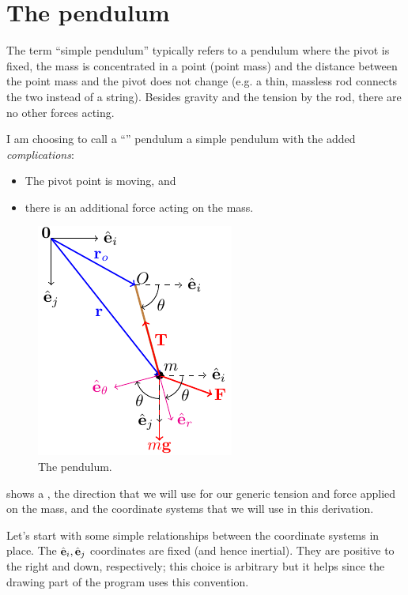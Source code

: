 \documentclass{article}
\begin{document}
\section{The \ntsp pendulum}
The term ``simple pendulum'' typically refers to a pendulum where the pivot is fixed, the mass is concentrated in a point (point mass) and the distance between the point mass and the pivot does not change (e.g. a thin, massless rod connects the two instead of a string). Besides gravity and the tension by the rod, there are no other forces acting.

I am choosing to call a ``\ntsp'' pendulum a simple pendulum with the added \emph{complications}:
\begin{itemize}
  \item The pivot point is moving, and
  \item there is an additional force acting on the mass.
\end{itemize}

\begin{figure}[ht]
  \centering
  \includegraphics{ntsp}
  \caption{The \ntsp pendulum.}
  \label{f:ntsp}
\end{figure}

 shows a \ntsp, the direction that we will use for our generic tension and force applied on the mass, and the coordinate systems that we will use in this derivation.

Let's start with some simple relationships between the coordinate systems in place. The ${\hat{\mathbf{e}}_i,\hat{\mathbf{e}}_j}$ coordinates are fixed (and hence inertial). They are positive to the right and down, respectively; this choice is arbitrary but it helps since the drawing part of the program uses this convention.
\end{document}
